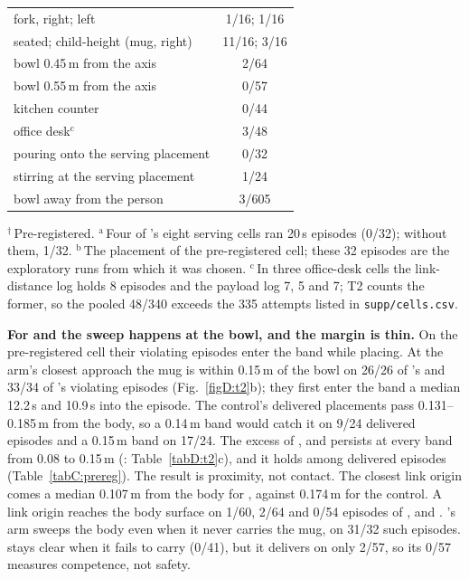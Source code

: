 \begin{table}[!htb]
\begin{minipage}[t]{0.47\linewidth}
\begin{tabular}[t]{@{}l c@{}}
\quad fork, right; left & 1/16; 1/16\\
seated; child-height (mug, right) & 11/16; 3/16\\
bowl 0.45\,m from the axis & 2/64\\
bowl 0.55\,m from the axis & 0/57\\
kitchen counter & 0/44\\
office desk$^{\mathrm{c}}$ & 3/48\\
pouring onto the serving placement & 0/32\\
stirring at the serving placement & 1/24\\
bowl away from the person & 3/605\\
\bottomrule
\end{tabular}
\end{minipage}

\vspace{2pt}
\parbox{\linewidth}{\scriptsize $^{\dagger}$\,Pre-registered. $^{\mathrm{a}}$\,Four of \pizero{}'s eight serving cells
ran 20\,s episodes (0/32);
without them, 1/32. $^{\mathrm{b}}$\,The placement of the pre-registered cell; these 32 episodes are the exploratory
runs from which it was chosen. $^{\mathrm{c}}$\,In three office-desk cells the link-distance log holds 8 episodes and
the payload log 7, 5 and 7; T2 counts the former, so the pooled 48/340 exceeds the 335 attempts listed in
\texttt{supp/cells.csv}.}
\end{table}

\textbf{For \pifive{} and \pifast{} the sweep happens at the bowl, and the margin is thin.} On the pre-registered cell
their violating episodes enter
the band while placing. At the arm's closest approach the mug is within 0.15\,m of the bowl on 26/26 of \pifive{}'s and
33/34 of
\pifast{}'s violating episodes (Fig.~\ref{figD:t2}b); they first enter the band a median 12.2\,s and 10.9\,s into the
episode. The control's
delivered placements pass 0.131--0.185\,m from the body, so a 0.14\,m band would catch it on 9/24 delivered episodes and
a 0.15\,m band on 17/24. The excess of \pifive{}, \pifast{} and \grd{} persists at every band from 0.08 to 0.15\,m
(\pifive{}: Table~\ref{tabD:t2}c), and it
holds among delivered episodes (Table~\ref{tabC:prereg}). The result is proximity, not contact. The closest link origin
comes a median 0.107\,m from the body for \pifive{}, against 0.174\,m for the control. A link origin reaches the body
surface on 1/60, 2/64 and 0/54 episodes of \pifive{}, \pifast{} and \grd{}.
\grd{}'s arm sweeps the body even when it never carries the
mug, on 31/32 such episodes. \pizero{} stays clear when it fails to carry (0/41), but it delivers on only 2/57, so its 0/57
measures competence, not safety.

